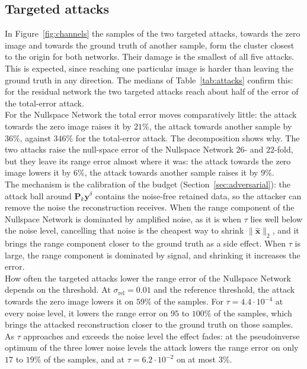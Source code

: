 \documentclass{article}
\numberwithin{equation}{section}
\begin{document}
\subsection{Targeted attacks}\label{sec:results-targeted}
In Figure~\ref{fig:channels} the samples of the two targeted attacks, towards the zero image and
towards the ground truth of another sample, form the cluster closest to the origin for both
networks. Their damage is the smallest of all five attacks. This is expected, since reaching one
particular image is harder than leaving the ground truth in any direction. The medians of
Table~\ref{tab:attacks} confirm this: for the residual network the two targeted attacks reach about
half of the error of the total-error attack.\\
For the Nullspace Network the total error moves comparatively little: the attack towards the zero image
raises it by $21\%$, the attack towards another sample by $36\%$, against $346\%$ for the total-error
attack. The decomposition shows why. The two attacks raise the null-space error of the Nullspace Network
$26$- and $22$-fold, but they leave its range error almost where it was: the attack towards the zero image
lowers it by $6\%$, the attack towards another sample raises it by $9\%$.\\
The mechanism is the calibration of the budget (Section~\ref{sec:adversarial}): the attack ball around
$\mathbf{P}_k\mathbf{y}^\delta$ contains the noise-free retained data, so the attacker can remove the noise
the reconstruction receives. When the range component of the Nullspace Network is dominated by amplified
noise, as it is when $\tau$ lies well below the noise level, cancelling that noise is the cheapest way to
shrink $\lVert\hat{\mathbf{x}}\rVert_2$, and it brings the range component closer to the ground truth as a
side effect. When $\tau$ is large, the range component is dominated by signal, and shrinking it increases
the error.\\
How often the targeted attacks lower the range error of the Nullspace Network depends on the threshold.
At $\sigma_\text{rel}=0.01$ and the reference threshold, the attack towards the zero image lowers it on
$59\%$ of the samples. For $\tau=4.4\cdot10^{-4}$ at every noise
level, it lowers the range error on $95$ to $100\%$ of the samples, which brings the attacked reconstruction closer to the
ground truth on those samples. As $\tau$ approaches and exceeds the
noise level the effect fades: at the pseudoinverse optimum of the three lower noise levels the attack lowers
the range error on only $17$ to $19\%$ of the samples, and at $\tau=6.2\cdot10^{-2}$ on at most $3\%$.
\end{document}
